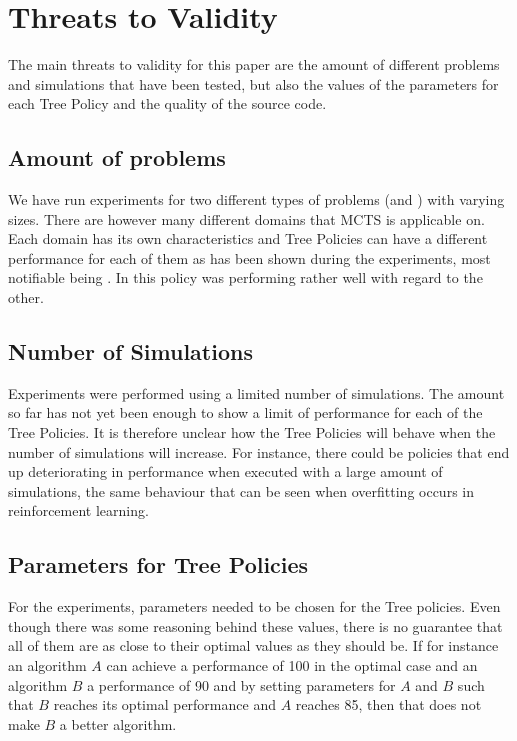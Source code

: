 \section{Threats to Validity}
The main threats to validity for this paper are the amount of different problems and simulations that have been tested, but also the values of the parameters for each Tree Policy and the quality of the source code. 

\subsection{Amount of problems}
We have run experiments for two different types of problems (\rock and \poc) with varying sizes. There are however many different domains that MCTS is applicable on. Each domain has its own characteristics and Tree Policies can have a different performance for each of them as has been shown during the experiments, most notifiable being \eroulette. In \rock this policy was performing rather well with regard to the other.

\subsection{Number of Simulations}
Experiments were performed using a limited number of simulations. The amount so far has not yet been enough to show a limit of performance for each of the Tree Policies. It is therefore unclear how the Tree Policies will behave when the number of simulations will increase. For instance, there could be policies that end up deteriorating in performance when executed with a large amount of simulations, the same behaviour that can be seen when overfitting occurs in reinforcement learning.

\subsection{Parameters for Tree Policies}
For the experiments, parameters needed to be chosen for the Tree policies. Even though there was some reasoning behind these values, there is no guarantee that all of them are as close to their optimal values as they should be. If for instance an algorithm $A$ can achieve a performance of 100 in the optimal case and an algorithm $B$ a performance of 90 and by setting parameters for $A$ and $B$ such that $B$ reaches its optimal performance and $A$ reaches 85, then that does not make $B$ a better algorithm.